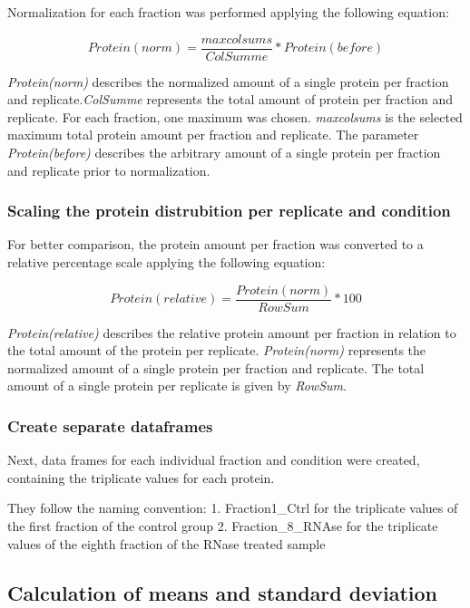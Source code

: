 \documentclass[
]{article}
\begin{document}
Normalization for each fraction was performed applying the following
equation:

\[Protein(norm) = \frac{maxcolsums}{ColSumme} * Protein(before)\]

\emph{Protein(norm)} describes the normalized amount of a single protein
per fraction and replicate.\emph{ColSumme} represents the total amount
of protein per fraction and replicate. For each fraction, one maximum
was chosen. \emph{maxcolsums} is the selected maximum total protein
amount per fraction and replicate. The parameter \emph{Protein(before)}
describes the arbitrary amount of a single protein per fraction and
replicate prior to normalization.

\hypertarget{scaling-the-protein-distrubition-per-replicate-and-condition}{%
\subsubsection{Scaling the protein distrubition per replicate and
condition}\label{scaling-the-protein-distrubition-per-replicate-and-condition}}

For better comparison, the protein amount per fraction was converted to
a relative percentage scale applying the following equation:

\[Protein(relative) = \frac{Protein(norm)}{RowSum}*100\]

\emph{Protein(relative)} describes the relative protein amount per
fraction in relation to the total amount of the protein per replicate.
\emph{Protein(norm)} represents the normalized amount of a single
protein per fraction and replicate. The total amount of a single protein
per replicate is given by \emph{RowSum}.

\hypertarget{create-separate-dataframes}{%
\subsubsection{Create separate
dataframes}\label{create-separate-dataframes}}

Next, data frames for each individual fraction and condition were
created, containing the triplicate values for each protein.

They follow the naming convention: 1. Fraction1\_Ctrl for the triplicate
values of the first fraction of the control group 2. Fraction\_8\_RNAse
for the triplicate values of the eighth fraction of the RNase treated
sample

\hypertarget{calculation-of-means-and-standard-deviation}{%
\subsection{Calculation of means and standard
deviation}\label{calculation-of-means-and-standard-deviation}}
\end{document}
